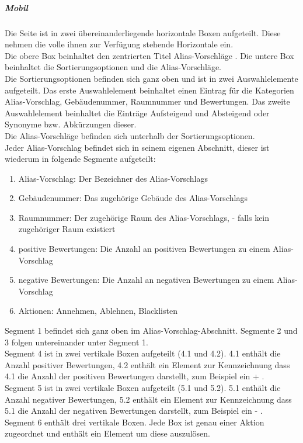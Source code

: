 \subparagraph*{Mobil}
Die Seite ist in zwei übereinanderliegende horizontale Boxen aufgeteilt. Diese nehmen die volle ihnen zur Verfügung stehende Horizontale ein.\\
Die obere Box beinhaltet den zentrierten Titel \dq Alias-Vorschläge \dq.
Die untere Box beinhaltet die Sortierungsoptionen und die Alias-Vorschläge.\\
Die Sortierungsoptionen befinden sich ganz oben und ist in zwei Auswahlelemente aufgeteilt. 
Das erste Auswahlelement beinhaltet einen Eintrag für die Kategorien Alias-Vorschlag, Gebäudenummer, Raumnummer und Bewertungen.
Das zweite Auswahlelement beinhaltet die Einträge \dq Aufsteigend \dq{} und \dq Absteigend \dq{} oder Synonyme bzw. Abkürzungen dieser.\\
Die Alias-Vorschläge befinden sich unterhalb der Sortierungsoptionen.\\
Jeder Alias-Vorschlag befindet sich in seinem eigenen Abschnitt, dieser ist wiederum in folgende Segmente aufgeteilt:

\begin{enumerate}
    \item Alias-Vorschlag: Der Bezeichner des Alias-Vorschlags
    \item Gebäudenummer: Das zugehörige Gebäude des Alias-Vorschlags
    \item Raumnummer: Der zugehörige Raum des Alias-Vorschlags, \dq - \dq{} falls kein zugehöriger Raum existiert
    \item positive Bewertungen: Die Anzahl an positiven Bewertungen zu einem Alias-Vorschlag
    \item negative Bewertungen: Die Anzahl an negativen Bewertungen zu einem Alias-Vorschlag
    \item Aktionen: Annehmen, Ablehnen, Blacklisten
\end{enumerate}

Segment 1 befindet sich ganz oben im Alias-Vorschlag-Abschnitt. Segmente 2 und 3 folgen untereinander unter Segment 1. \\
Segment 4 ist in  zwei vertikale Boxen aufgeteilt (4.1 und 4.2).
4.1 enthält die Anzahl positiver Bewertungen, 4.2 enthält ein Element zur Kennzeichnung dass 4.1 die Anzahl der positiven Bewertungen darstellt, zum Beispiel ein \dq + \dq. \\
Segment 5 ist in  zwei vertikale Boxen aufgeteilt (5.1 und 5.2). 
5.1 enthält die Anzahl negativer Bewertungen, 5.2 enthält ein Element zur Kennzeichnung dass 5.1 die Anzahl der negativen Bewertungen darstellt, zum Beispiel ein \dq - \dq. \\
Segment 6 enthält drei vertikale Boxen. Jede Box ist genau einer Aktion zugeordnet und enthält ein Element um diese auszulösen.

